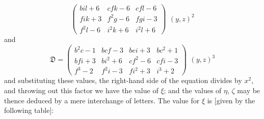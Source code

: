 \documentclass[11pt,a4paper]{book}
\begin{document}
\begin{center}
\[\begin{pmatrix}
bil + 6 & cfk - 6 & cfl - 6 \\
fik + 3 & f^2g - 6 & fgi - 3 \\
f^2l - 6 & i^2k + 6 & i^2l + 6
\end{pmatrix}
\!\!\:\, (y, z)^2
\]
and
\[
\mathfrak{D} =
\begin{pmatrix}
b^2c - 1 & bcf - 3 & bei + 3 & bc^2 + 1 \\
bfi + 3 & bi^2 + 6 & cf^2 - 6 & cfi - 3 \\
f^3 - 2 & f^2i - 3 & fi^2 + 3 & i^3 + 2
\end{pmatrix}
\!\!\:\, (y, z)^3
\]
and substituting these values, the right-hand side of the equation divides by $x^2$, and throwing out this factor we have the value of $\xi$; and the values of $\eta$, $\zeta$ may be thence deduced by a mere interchange of letters. The value for $\xi$ is [given by the following table]:


\end{center}
\end{document}
